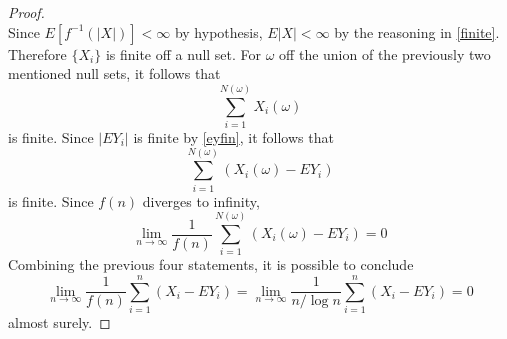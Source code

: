 \documentclass[letterpaper, 12pt]{article}
\begin{document}
\begin{proof}
\[\]
Since $E[f^{-1}(|X|)] < \infty$ by hypothesis,  $E|X| < \infty$ by the reasoning in \eqref{finite}. 
Therefore $\{X_i\}$ is finite off a null set. For $\omega$ off the union of the previously two mentioned null sets, it follows that
\[
\sum_{i=1}^{N(\omega)} X_i(\omega)
\]
is finite. Since $|EY_i|$ is finite by \eqref{eyfin}, it follows that 
\[
\sum_{i=1}^{N(\omega)} (X_i(\omega) - EY_i)
\]
is finite. Since $f(n)$ diverges to infinity,
\[
\lim_{n\to\infty}\frac{1}{f(n)} 
\sum_{i=1}^{N(\omega)} 
(X_i(\omega) - EY_i) 
= 0
\]
Combining the previous four statements, it is possible to conclude
\begin{equation}
\lim_{n\to\infty}\frac{1}{f(n)} \sum_{i=1}^n (X_i - EY_i) 
=
\lim_{n\to\infty}\frac{1}{n/\log n} \sum_{i=1}^n (X_i - EY_i)
= 
0
\label{both}
\end{equation}
almost surely.


\end{proof}
\end{document}
